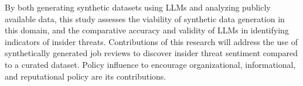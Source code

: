 By both generating synthetic datasets using LLMs and analyzing publicly available data, this study assesses the viability of synthetic data generation in this domain, and the comparative accuracy and validity of LLMs in identifying indicators of insider threats. Contributions of this research will address the use of synthetically generated job reviews to discover insider threat sentiment compared to a curated dataset. Policy influence to encourage organizational, informational, and reputational policy are its contributions.